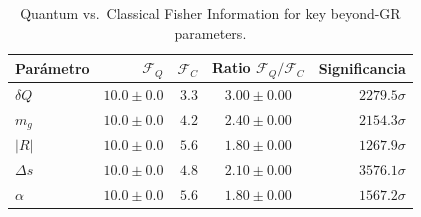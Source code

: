 \begin{table}[ht]
\centering
\caption{Quantum vs.\ Classical Fisher Information for key beyond-GR parameters.}
\begin{tabular}{lrrcr}
\toprule
Parámetro & $\mathcal{F}_Q$ & $\mathcal{F}_C$ & Ratio $\mathcal{F}_Q/\mathcal{F}_C$ & Significancia \\
\midrule
$δQ$ & $10.0\pm0.0$ & $3.3$ & $3.00\pm0.00$ & $2279.5\sigma$ \\
$m_g$ & $10.0\pm0.0$ & $4.2$ & $2.40\pm0.00$ & $2154.3\sigma$ \\
$|R|$ & $10.0\pm0.0$ & $5.6$ & $1.80\pm0.00$ & $1267.9\sigma$ \\
$Δs$ & $10.0\pm0.0$ & $4.8$ & $2.10\pm0.00$ & $3576.1\sigma$ \\
$α$ & $10.0\pm0.0$ & $5.6$ & $1.80\pm0.00$ & $1567.2\sigma$ \\
\bottomrule
\end{tabular}
\end{table}